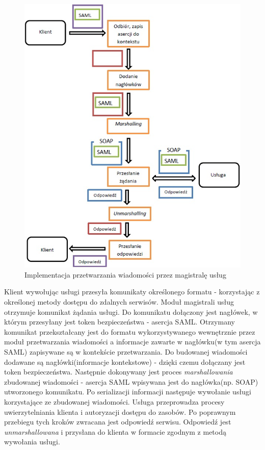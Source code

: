 	\begin{figure}[h]
		\centering
		\includegraphics{img/esbRoute.jpg}
		\caption{Implementacja przetwarzania wiadomości przez magistralę usług}
		\label{ESB route}
	\end{figure}

	Klient wywołując usługi przesyła komunikaty określonego formatu - korzystając z określonej metody dostępu do zdalnych serwisów. Moduł magistrali usług otrzymuje komunikat żądania usługi. Do komunikatu dołączony jest nagłówek, w którym przesyłany jest token bezpieczeństwa - asercja SAML. Otrzymany komunikat przekształcany jest do formatu wykorzystywanego wewnętrznie przez moduł przetwarzania wiadomości a informacje zawarte w nagłówku(w tym asercja SAML) zapisywane są w kontekście przetwarzania. Do budowanej wiadomości dodawane są nagłówki(informacje kontekstowe) - dzięki czemu dołączany jest token bezpieczeństwa. Następnie dokonywany jest proces \textit{marshallowania} zbudowanej wiadomości - asercja SAML wpisywana jest do nagłówka(np. SOAP) utworzonego komunikatu. Po serializacji informacji następuje wywołanie usługi korzystające ze zbudowanej wiadomości. Usługa przeprowadza procesy uwierzytelniania klienta i autoryzacji dostępu do zasobów. Po poprawnym przebiegu tych kroków zwracana jest odpowiedź serwisu. Odpowiedź jest \textit{unmarshallowana} i przysłana do klienta w formacie zgodnym z metodą wywołania usługi.

